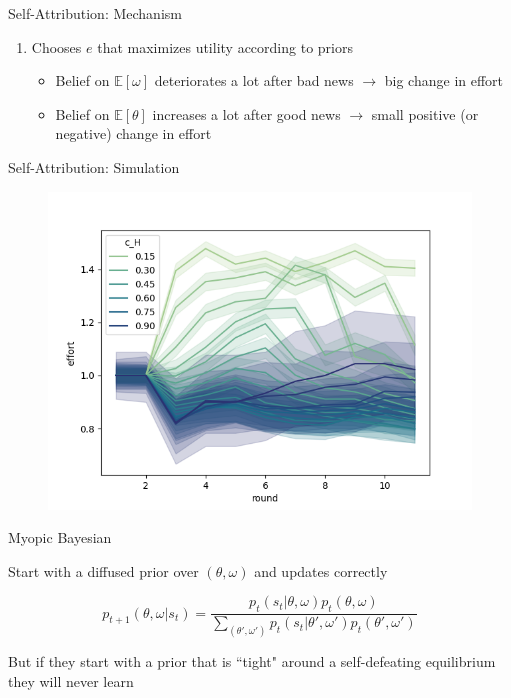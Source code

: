 \documentclass[aspectratio=169]{beamer}
\begin{document}
\begin{frame}{Self-Attribution: Mechanism}
    \begin{enumerate}
        \item Chooses $e$ that maximizes utility according to priors
        \bigskip
        \begin{itemize}
            \item Belief on $\mathbb{E}[\omega]$ deteriorates a lot after bad news $\to$ big change in effort
            \item Belief on $\mathbb{E}[\theta]$ increases a lot after good news $\to$ small positive (or negative) change in effort \\
        \end{itemize}
    \end{enumerate}
    
\end{frame}


\begin{frame}{Self-Attribution: Simulation}
        \begin{figure}
            \centering
            \includegraphics[scale=.5]{self-serving_11.png}
        
        \end{figure}
    \end{frame}

    \begin{frame}{Myopic Bayesian}

        Start with a diffused prior over $(\theta, \omega)$ and updates correctly
    
        $$ p_{t+1}(\theta, \omega| s_t)=\frac{p_t(s_t|\theta, \omega)p_t(\theta, \omega)}{\sum_{(\theta', \omega')}p_t(s_t|\theta', \omega')p_t(\theta', \omega')} $$
    
        But if they start with a prior that is ``tight" 
        around a self-defeating equilibrium they will never learn 
        
    \end{frame}
\end{document}
